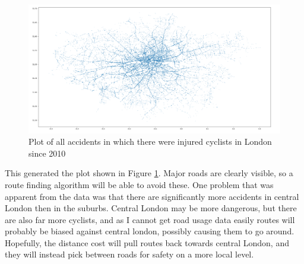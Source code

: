 \documentclass[11pt,twoside,a4paper]{report}
\begin{document}
\begin{figure}[h]
    \begin{center}
    \includegraphics[width=18cm]{chart.png}
    \end{center}
    \caption{Plot of all accidents in which there were injured cyclists in London since 2010}
    \label{chart}
\end{figure}
This generated the plot shown in Figure \ref{chart}. Major roads are clearly visible, so a route finding algorithm will be able to avoid these. One problem that was apparent from the data was that there 
are significantly more accidents in central London then in the suburbs. Central London may be more dangerous, but there are also far more cyclists, and as I cannot get road usage data easily routes will probably be biased against
central london, possibly causing them to go around. Hopefully, the distance cost will pull routes back towards central London, and they will instead pick between roads for safety on a more local level.
\newpage
\end{document}
